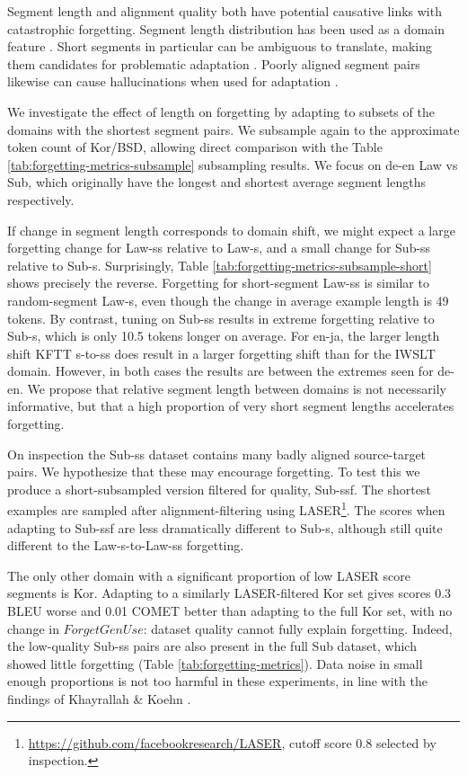 \documentclass[11pt]{article}
\begin{document}
Segment length and alignment quality both have potential causative links with catastrophic forgetting. Segment length distribution has been used as a domain feature \cite{varis-bojar-2021-sequence}. Short segments in particular can be ambiguous to translate, making them candidates for problematic adaptation \cite{wan-etal-2022-challenges}. Poorly aligned segment pairs likewise can cause hallucinations when used for adaptation \cite{saunders-byrne-2020-addressing}. 

We investigate the effect of  length  on forgetting by adapting to subsets of the domains with the shortest segment pairs.  We subsample again to the approximate token count of Kor/BSD, allowing direct comparison with the Table \ref{tab:forgetting-metrics-subsample} subsampling results.  We focus on de-en Law vs Sub, which originally have the longest and shortest average segment lengths respectively. 

If change in segment length corresponds to domain shift, we might expect a large forgetting change for Law-ss relative to Law-s, and a small change for Sub-ss relative to Sub-s. Surprisingly,  Table \ref{tab:forgetting-metrics-subsample-short} shows precisely the reverse. Forgetting for  short-segment Law-ss is similar to  random-segment Law-s, even though the change in average example length is 49 tokens. By contrast, tuning on Sub-ss results in extreme forgetting relative to Sub-s, which is only 10.5 tokens longer on average. For en-ja, the larger length shift KFTT s-to-ss does result in a larger forgetting shift than for the IWSLT domain. However, in both cases the results are between the extremes seen for de-en. We propose that relative segment length between domains is not necessarily informative, but that a high proportion of very short segment lengths accelerates forgetting.





On inspection the Sub-ss dataset contains many badly aligned source-target pairs. We hypothesize that these may encourage forgetting. To test this we produce a short-subsampled version filtered for quality, Sub-ssf. The shortest examples are sampled after alignment-filtering using LASER\footnote{ \url{https://github.com/facebookresearch/LASER}, cutoff score 0.8 selected by inspection.}. The scores when adapting to Sub-ssf are less dramatically different to Sub-s, although still quite different to the Law-s-to-Law-ss forgetting. 

The only other domain with a significant proportion of low LASER score segments is Kor. Adapting to a similarly LASER-filtered Kor set gives scores 0.3 BLEU worse and 0.01 COMET better than adapting to the full Kor set, with no change in $ForgetGenUse$: dataset quality cannot fully explain forgetting. Indeed, the low-quality Sub-ss pairs are also present in the full Sub dataset, which showed little forgetting (Table \ref{tab:forgetting-metrics}). Data noise in small enough proportions is not too harmful in these experiments, in line with the findings of Khayrallah \& Koehn .
\end{document}

